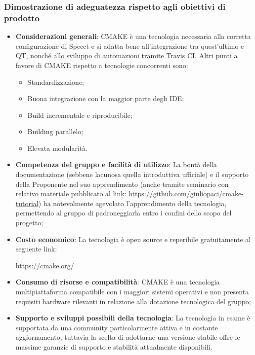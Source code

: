 \documentclass[./../Technology Baseline.tex]{subfiles}
\begin{document}
\subsubsection{Dimostrazione di adeguatezza rispetto agli obiettivi di prodotto}
\begin{itemize}
	\item \textbf{Considerazioni generali}: CMAKE è una tecnologia necessaria alla corretta configurazione di Speect e si adatta bene all'integrazione tra quest'ultimo e QT, nonché allo sviluppo di automazioni tramite Travis CI. Altri punti a favore di CMAKE rispetto a tecnologie concorrenti sono:
	\begin{itemize}
		\item Standardizzazione;
		\item Buona integrazione con la maggior parte degli IDE;
		\item Build incrementale e riproducibile;
		\item Building parallelo;
		\item Elevata modularità.
	\end{itemize}
	\item \textbf{Competenza del gruppo e facilità di utilizzo}: La bontà della documentazione (sebbene lacunosa quella introduttiva ufficiale) e il supporto della Proponente nel suo apprendimento (anche tramite seminario con relativo materiale pubblicato al link: \url{https://github.com/giuliopaci/cmake-tutorial}) ha notevolmente agevolato l'apprendimento della tecnologia, permettendo al gruppo di padroneggiarla entro i confini dello scopo del progetto;
	
	\item \textbf{Costo economico}: La tecnologia è open source e reperibile gratuitamente al seguente link:
	\begin{center}
		\url{https://cmake.org/}
	\end{center}

	\item \textbf{Consumo di risorse e compatibilità}: CMAKE è una tecnologia multipiattaforma compatibile con i maggiori sistemi operativi e non presenta requisiti hardware rilevanti in relazione alla dotazione tecnologica del gruppo;
	
	\item \textbf{Supporto e sviluppi possibili della tecnologia}: La tecnologia in esame è supportata da una community particolarmente attiva e in costante aggiornamento, tuttavia la scelta di adottarne una versione stabile offre le massime garanzie di supporto e stabilità attualmente disponibili.
\end{itemize}
\end{document}
